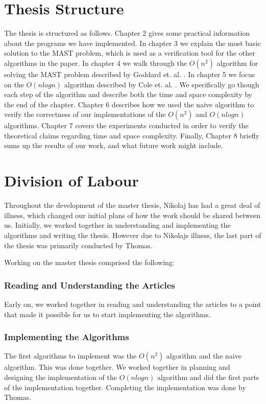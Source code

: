 \section{Thesis Structure}
The thesis is structured as follows. Chapter 2 gives some practical information about the programs we have implemented. In chapter 3 we explain the most basic solution to the MAST problem, which is used as a verification tool for the other algorithms in the paper. In chapter 4 we walk through the $O(n^2)$ algorithm for solving the MAST problem described by Goddard et. al. \cite{nsquared}. In chapter 5 we focus on the $O(nlogn)$ algorithm described by Cole et. al. \cite{nlogn}. We specifically go though each step of the algorithm and describe both the time and space complexity by the end of the chapter. Chapter 6 describes how we used the naive algorithm to verify the correctness of our implementations of the $O(n^2)$ and $O(nlogn)$ algorithms. Chapter 7 covers the experiments conducted in order to verify the theoretical claims regarding time and space complexity. Finally, Chapter 8 briefly sums up the results of our work, and what future work might include.

\section{Division of Labour}
Throughout the development of the master thesis, Nikolaj has had a great deal of illness, which changed our initial plans of how the work should be shared between us. Initially, we worked together in understanding and implementing the algorithms and writing the thesis. However due to Nikolajs illness, the last part of the thesis was primarily conducted by Thomas.

Working on the master thesis comprised the following:

\subsubsection{Reading and Understanding the Articles}
Early on, we worked together in reading and understanding the articles to a point that made it possible for us to start implementing the algorithms.

\subsubsection{Implementing the Algorithms}
The first algorithms to implement was the $O(n^2)$ algorithm and the naive algorithm. This was done together. We worked together in planning and designing the implementation of the $O(nlogn)$ algorithm and did the first parts of the implementation together. Completing the implementation was done by Thomas.

